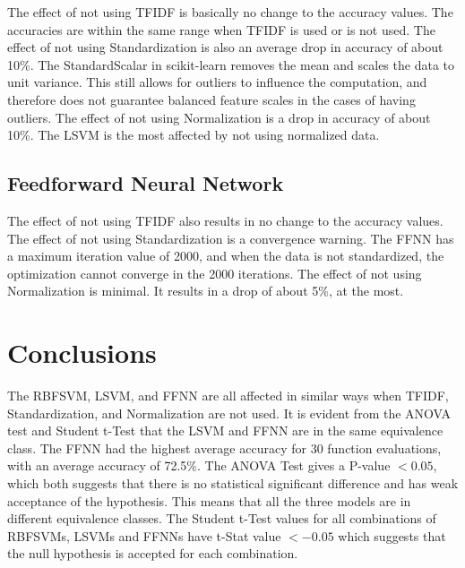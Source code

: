 \documentclass[conference]{IEEEtran}
\begin{document}
The effect of not using TFIDF is basically no change to the accuracy values. The accuracies are within the same range when TFIDF is used or is not used. 
The effect of not using Standardization is also an average drop in accuracy of about 10\%. The StandardScalar in scikit-learn removes the mean and scales the data to unit variance. This still allows for outliers to influence the computation, and therefore does not guarantee balanced feature scales in the cases of having outliers.
The effect of not using Normalization is a drop in accuracy of about 10\%. The LSVM is the most affected by not using normalized data. 

\subsection{Feedforward Neural Network}

The effect of not using TFIDF also results in no change to the accuracy values. 
The effect of not using Standardization is a convergence warning. The FFNN has a maximum iteration value of 2000, and when the data is not standardized, the optimization cannot converge in the 2000 iterations.
The effect of not using Normalization is minimal. It results in a drop of about 5\%, at the most. 

\section{Conclusions}
%

The RBFSVM, LSVM, and FFNN are all affected in similar ways when TFIDF, Standardization, and Normalization are not used. 
It is evident from the ANOVA test and Student t-Test that the LSVM and FFNN are in the same equivalence class. The FFNN had the highest average accuracy for 30 function evaluations, with an average accuracy of 72.5\%. The ANOVA Test gives a P-value \begin{math}{< 0.05}\end{math}, which both suggests that there is no statistical significant difference and has weak acceptance of the hypothesis. This means that all the three models are in different equivalence classes. The Student t-Test values for all combinations of RBFSVMs, LSVMs and FFNNs have t-Stat value \begin{math}{< -0.05}\end{math} which suggests that the null hypothesis is accepted for each combination.
\end{document}
